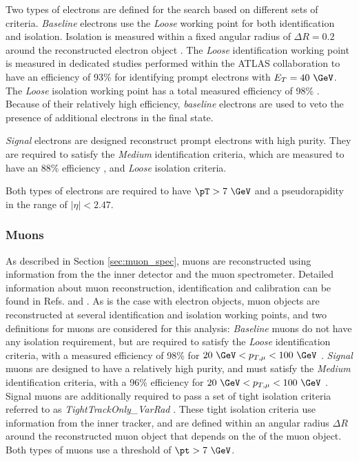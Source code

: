Two types of electrons are defined for the search based on different sets of criteria.
\emph{Baseline} electrons use the \emph{Loose} working point for both identification and isolation. Isolation is measured within a fixed angular radius of \(\Delta R=0.2\) around the reconstructed electron object \cite{PERF-2017-01}. The \emph{Loose} identification working point is measured in dedicated studies performed within the ATLAS collaboration to have an efficiency of 93\% \cite{PERF-2017-01} for identifying prompt electrons with \(E_T=40~\GeV\). The \emph{Loose} isolation working point has a total measured efficiency of 98\% \cite{PERF-2017-01}. Because of their relatively high efficiency, \emph{baseline} electrons are used to veto the presence of additional electrons in the final state.

\emph{Signal} electrons are designed reconstruct prompt electrons with high purity. They are required to satisfy the \emph{Medium} identification criteria, which are measured to have an 88\% efficiency \cite{PERF-2017-01}, and \emph{Loose} isolation criteria.

Both types of electrons are required to have \(\pT > 7~\GeV\) and a pseudorapidity in the range of \(|\eta| < 2.47\).

\subsubsection{Muons}

As described in Section \ref{sec:muon_spec}, muons are reconstructed using information from the the inner detector and the muon spectrometer. Detailed information about muon reconstruction, identification and calibration can be found in Refs. \cite{PERF-2015-10} and \cite{ATL-PHYS-PROC-2018-052}. As is the case with electron objects, muon objects are reconstructed at several identification and isolation working points, and two definitions for muons are considered for this analysis:
\newline \emph{Baseline} muons do not have any isolation requirement, but are required to satisfy the \emph{Loose} identification criteria, with a measured efficiency of 98\% for \(20~\GeV<p_{T, \mu}<100~\GeV\) \cite{PERF-2015-10}.
\newline \emph{Signal} muons are designed to have a relatively high purity, and must satisfy the \emph{Medium} identification criteria, with a 96\% efficiency for \(20~\GeV<p_{T, \mu}<100~\GeV\) \cite{PERF-2015-10}. Signal muons are additionally required to pass a set of tight isolation criteria referred to as \emph{TightTrackOnly\_VarRad} \cite{ATL-PHYS-PROC-2018-052}. These tight isolation criteria use information from the inner tracker, and are defined within an angular radius \(\Delta R\) around the reconstructed muon object that depends on the \pt of the muon object.
\newline Both types of muons use a threshold of \(\pt > 7~\GeV \). 

